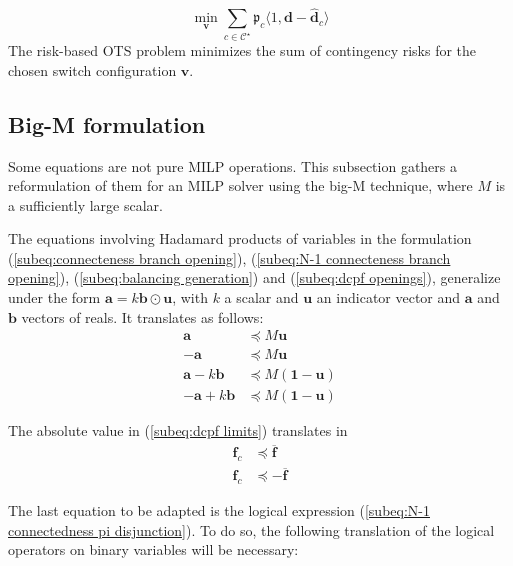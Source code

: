 \begin{equation}
    \min_{\pmb{v}}\sum_{c \in \mathcal{C}^\star} \mathfrak{p}_{c} \langle 1, \pmb
    {d}- \hat{\pmb{d}}_{c} \rangle \label{eq:cost function}
\end{equation}
The risk-based OTS problem minimizes the sum of contingency risks for the chosen switch configuration $\pmb{v}$.


\subsection{Big-M formulation}
\label{ss:bigM} Some equations are not pure MILP operations. This subsection gathers
a reformulation of them for an MILP solver using the big-M technique, where $M$ is
a sufficiently large scalar.

The equations involving Hadamard products of variables in the formulation (\ref{subeq:connecteness
branch opening}), (\ref{subeq:N-1 connecteness branch opening}), (\ref{subeq:balancing generation}) and (\ref{subeq:dcpf openings}), generalize
under the form $\pmb{a}= k \pmb{b}\odot \pmb{u}$, with $k$ a scalar and
$\pmb{u}$ an indicator vector and $\pmb{a}$ and $\pmb{b}$ vectors of reals. It translates
as follows:
\begin{subequations}
    \begin{align}
        \pmb{a}            & \preceq M\pmb{u}            \\
        -\pmb{a}           & \preceq M\pmb{u}            \\
        \pmb{a}- k\pmb{b}  & \preceq M(\pmb{1}- \pmb{u}) \\
        -\pmb{a}+ k\pmb{b} & \preceq M(\pmb{1}- \pmb{u})
    \end{align}
\end{subequations}

The absolute value in (\ref{subeq:dcpf limits}) translates in
\begin{subequations}
    \begin{align}
        \pmb{f}_{c} & \preceq \overline{\pmb{f}}  \\
        \pmb{f}_{c} & \preceq -\overline{\pmb{f}}
    \end{align}
\end{subequations}

The last equation to be adapted is the logical expression (\ref{subeq:N-1
connectedness pi disjunction}). To do so, the following translation of the
logical operators on binary variables will be necessary:

